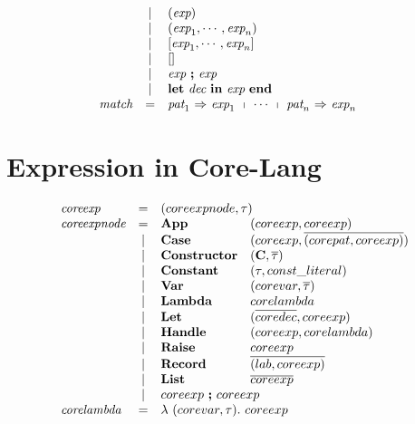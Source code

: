 \documentclass[11pt,a4paper]{article}
\newcommand{\key}[1]{\textrm{\textbf{#1}}}
\newcommand{\prodlhs}[1]{\textit{#1}}
\newcommand{\lam}  {\mathbf\lambda}
\newcommand{\vcon} {\mathbf{C}}
\newcommand{\vect}[1]{\overline{#1}}
\begin{document}
{\[\begin{array}{lcll}
    & | & (\prodlhs{exp})                                                           &\\
    & | & (\prodlhs{exp}_1, \cdots, \prodlhs{exp}_n)                                &\\
    & | & [\prodlhs{exp}_1, \cdots, \prodlhs{exp}_n]                                &\\
    & | & []                                                                        &\\
    & | & \prodlhs{exp}\ \key{;}\ \prodlhs{exp}                                     &\\
    & | & \key{let}\ \prodlhs{dec}\ \key{in}\ \prodlhs{exp}\ \key{end}              &\\
\prodlhs{match}
    & = & \prodlhs{pat}_1\ \key{$\Rightarrow$}\ \prodlhs{exp}_1\ \shortmid\ \cdots\ \shortmid\ \prodlhs{pat}_n\ \key{$\Rightarrow$}\ \prodlhs{exp}_n & \\
\end{array}
\]}

\section {Expression in Core-Lang}
{\renewcommand{\arraystretch}{1.2}\[
\begin{array}{lcll}
\prodlhs{coreexp}
	& = & \multicolumn{2}{l}{(coreexpnode, \tau)}				\\
\prodlhs{coreexpnode}
    & = & \key{App}  & (coreexp, coreexp)						\\
    & | & \key{Case} & (coreexp, \vect{(corepat,coreexp)})   	\\
    & | & \key{Constructor} & (\vcon, \vect\tau)				\\
    & | & \key{Constant}	& (\tau, const\_literal)			\\
    & | & \key{Var}  		& (corevar, \vect\tau)     		    \\ 
    & | & \key{Lambda}  	& corelambda						\\ 
    & | & \key{Let}			& (\vect{coredec}, coreexp)			\\
    & | & \key{Handle}		& (coreexp, corelambda)             \\
    & | & \key{Raise}		& coreexp							\\
    & | & \key{Record}		& \vect{(lab, coreexp)} 		    \\		 
    & | & \key{List}		& \vect{coreexp}					\\
    & | & \multicolumn{2}{l}{coreexp\ \key{;}\ coreexp}			\\
\prodlhs{corelambda}
	& = & \multicolumn{2}{l}{\lam\ (corevar, \tau).\ coreexp} \\
\end{array}
\]}
\end{document}
